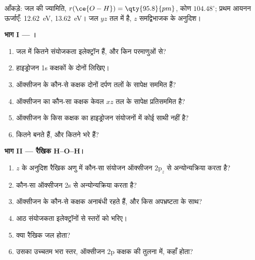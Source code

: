 \begin{problem}
\label{pb:b2:fragment-orbitals:1}
आँकड़े: जल की ज्यामिति, $r(\ce{O-H}) = \qty{95.8}{pm}$, कोण
$104.48^\circ$; प्रथम आयनन ऊर्जाएँ:  \qty{12.62}{eV}, 
\qty{13.62}{eV}। जल $yz$ तल में है, $z$ समद्विभाजक के अनुदिश।

\medskip
\noindent\textbf{भाग I --- ।}
\begin{enumerate}
  \item जल में कितने संयोजकता इलेक्ट्रॉन हैं, और किन परमाणुओं से?
  \item हाइड्रोजन 1s कक्षकों के दोनों  लिखिए।
  \item ऑक्सीजन के कौन-से कक्षक दोनों दर्पण तलों के सापेक्ष सममित हैं?
  \item ऑक्सीजन का कौन-सा कक्षक केवल $xz$ तल के सापेक्ष प्रतिसममित है?
  \item ऑक्सीजन के किस कक्षक का हाइड्रोजन संयोजनों में कोई साथी नहीं है?
  \item कितने  बनते हैं, और कितने भरे हैं?
\end{enumerate}

\medskip
\noindent\textbf{भाग II --- रैखिक H--O--H।}
\begin{enumerate}[resume]
  \item $z$ के अनुदिश रैखिक अणु में कौन-सा संयोजन
        ऑक्सीजन $2\mathrm p_z$ से अन्योन्यक्रिया करता है?
  \item कौन-सा ऑक्सीजन 2s से अन्योन्यक्रिया करता है?
  \item ऑक्सीजन के कौन-से कक्षक अनाबंधी रहते हैं, और किस अपभ्रष्टता के साथ?
  \item आठ संयोजकता इलेक्ट्रॉनों से स्तरों को भरिए।
  \item क्या रैखिक जल  होता?
  \item उसका उच्चतम भरा स्तर, ऑक्सीजन 2p कक्षक की तुलना में, कहाँ
        होता?
\end{enumerate}


\end{problem}
